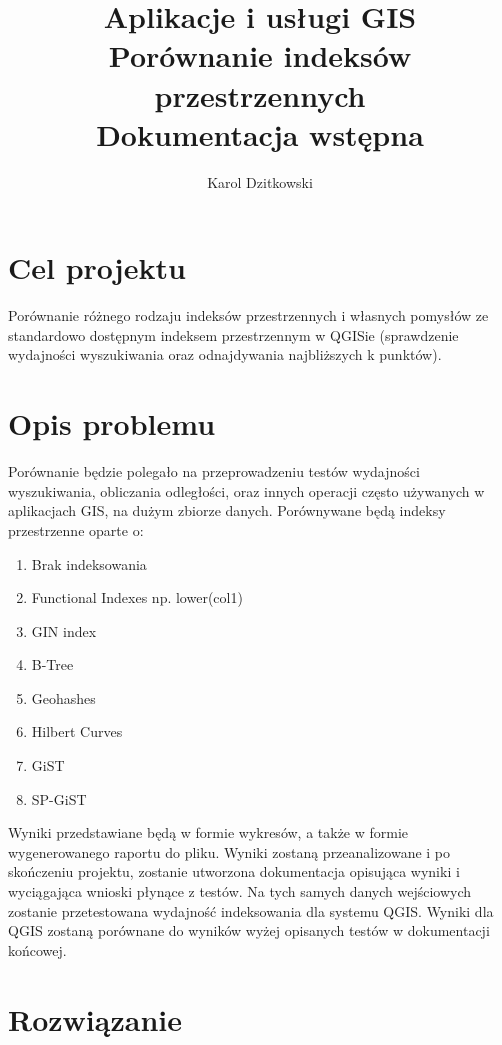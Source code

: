\documentclass[11pt,a4paper]{article}
\author{Karol Dzitkowski}
\title{
	Aplikacje i usługi GIS\\
	\huge{Porównanie indeksów przestrzennych}\\
 	Dokumentacja wstępna
 }
\begin{document}
\maketitle
\newpage

\tableofcontents
\newpage

\section{Cel projektu}
Porównanie różnego rodzaju indeksów przestrzennych i własnych pomysłów ze standardowo dostępnym indeksem przestrzennym w QGISie
(sprawdzenie wydajności wyszukiwania oraz odnajdywania najbliższych k punktów).
\section{Opis problemu}
Porównanie będzie polegało na przeprowadzeniu testów wydajności wyszukiwania, obliczania odległości, oraz innych operacji często
używanych w aplikacjach GIS, na dużym zbiorze danych. Porównywane będą indeksy przestrzenne oparte o:
\begin{enumerate}
	\item Brak indeksowania
	\item Functional Indexes np. lower(col1)
	\item GIN index
	\item B-Tree
	\item Geohashes
	\item Hilbert Curves
	\item GiST
	\item SP-GiST
\end{enumerate}
Wyniki przedstawiane będą w formie wykresów, a także w formie wygenerowanego raportu do pliku. Wyniki zostaną przeanalizowane i
po skończeniu projektu, zostanie utworzona dokumentacja opisująca wyniki i wyciągająca wnioski płynące z testów. Na tych samych danych
wejściowych zostanie przetestowana wydajność indeksowania dla systemu QGIS. Wyniki dla QGIS zostaną porównane do wyników wyżej opisanych 
testów w dokumentacji końcowej.
\section{Rozwiązanie}
\end{document}
